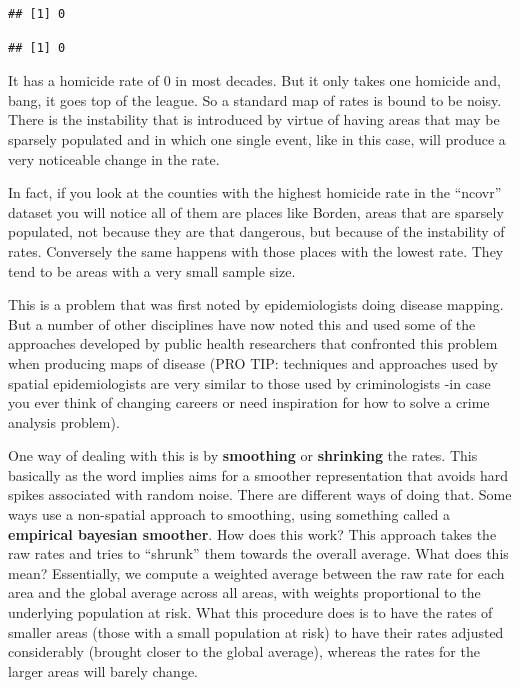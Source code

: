 \documentclass[
]{book}
\newenvironment{Shaded}{\begin{snugshade}}{\end{snugshade}}
\newcommand{\NormalTok}[1]{#1}
\newcommand{\SpecialCharTok}[1]{\textcolor[rgb]{0.00,0.00,0.00}{#1}}
\begin{document}
\begin{verbatim}
## [1] 0
\end{verbatim}

\begin{Shaded}
\end{Shaded}

\begin{verbatim}
## [1] 0
\end{verbatim}

It has a homicide rate of 0 in most decades. But it only takes one homicide and, bang, it goes top of the league. So a standard map of rates is bound to be noisy. There is the instability that is introduced by virtue of having areas that may be sparsely populated and in which one single event, like in this case, will produce a very noticeable change in the rate.

In fact, if you look at the counties with the highest homicide rate in the ``ncovr'' dataset you will notice all of them are places like Borden, areas that are sparsely populated, not because they are that dangerous, but because of the instability of rates. Conversely the same happens with those places with the lowest rate. They tend to be areas with a very small sample size.

This is a problem that was first noted by epidemiologists doing disease mapping. But a number of other disciplines have now noted this and used some of the approaches developed by public health researchers that confronted this problem when producing maps of disease (PRO TIP: techniques and approaches used by spatial epidemiologists are very similar to those used by criminologists -in case you ever think of changing careers or need inspiration for how to solve a crime analysis problem).

One way of dealing with this is by \textbf{smoothing} or \textbf{shrinking} the rates. This basically as the word implies aims for a smoother representation that avoids hard spikes associated with random noise. There are different ways of doing that. Some ways use a non-spatial approach to smoothing, using something called a \textbf{empirical bayesian smoother}. How does this work? This approach takes the raw rates and tries to ``shrunk'' them towards the overall average. What does this mean? Essentially, we compute a weighted average between the raw rate for each area and the global average across all areas, with weights proportional to the underlying population at risk. What this procedure does is to have the rates of smaller areas (those with a small population at risk) to have their rates adjusted considerably (brought closer to the global average), whereas the rates for the larger areas will barely change.
\end{document}
